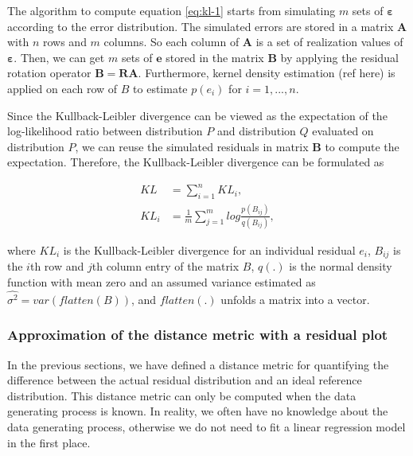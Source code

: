 \documentclass[]{interact}
\theoremstyle{plain}%
\theoremstyle{definition}
\theoremstyle{remark}
\begin{document}
The algorithm to compute equation \ref{eq:kl-1} starts from simulating
\(m\) sets of \(\boldsymbol{\varepsilon}\) according to the error
distribution. The simulated errors are stored in a matrix
\(\boldsymbol{A}\) with \(n\) rows and \(m\) columns. So each column of
\(\boldsymbol{A}\) is a set of realization values of
\(\boldsymbol{\varepsilon}\). Then, we can get \(m\) sets of
\(\boldsymbol{e}\) stored in the matrix \(\boldsymbol{B}\) by applying
the residual rotation operator
\(\boldsymbol{B} = \boldsymbol{R}\boldsymbol{A}\). Furthermore, kernel
density estimation (ref here) is applied on each row of \(B\) to
estimate \(p(e_i)\) for \(i = 1, ..., n\).

Since the Kullback-Leibler divergence can be viewed as the expectation
of the log-likelihood ratio between distribution \(P\) and distribution
\(Q\) evaluated on distribution \(P\), we can reuse the simulated
residuals in matrix \(\boldsymbol{B}\) to compute the expectation.
Therefore, the Kullback-Leibler divergence can be formulated as

\begin{align}
\label{eq:kl-3}
KL &= \sum_{i = 1}^{n} KL_i, \\
KL_i &= \frac{1}{m}\sum_{j = 1}^{m} log\frac{p(B_{ij})}{q(B_{ij})},
\end{align}

\noindent where \(KL_i\) is the Kullback-Leibler divergence for an
individual residual \(e_i\), \(B_{ij}\) is the \(i\)th row and \(j\)th
column entry of the matrix \(B\), \(q(.)\) is the normal density
function with mean zero and an assumed variance estimated as
\(\hat{\sigma^2} = var(flatten(B))\), and \(flatten(.)\) unfolds a
matrix into a vector.

\hypertarget{approximation-of-the-distance-metric-with-a-residual-plot}{%
\subsubsection{Approximation of the distance metric with a residual
plot}\label{approximation-of-the-distance-metric-with-a-residual-plot}}

In the previous sections, we have defined a distance metric for
quantifying the difference between the actual residual distribution and
an ideal reference distribution. This distance metric can only be
computed when the data generating process is known. In reality, we often
have no knowledge about the data generating process, otherwise we do not
need to fit a linear regression model in the first place.
\end{document}
